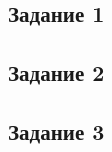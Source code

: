 


	

	\newpage
	
	\subsection*{Задание 1}
	
	
	\subsection*{Задание 2}
	
	
	\subsection*{Задание 3}
	
	
